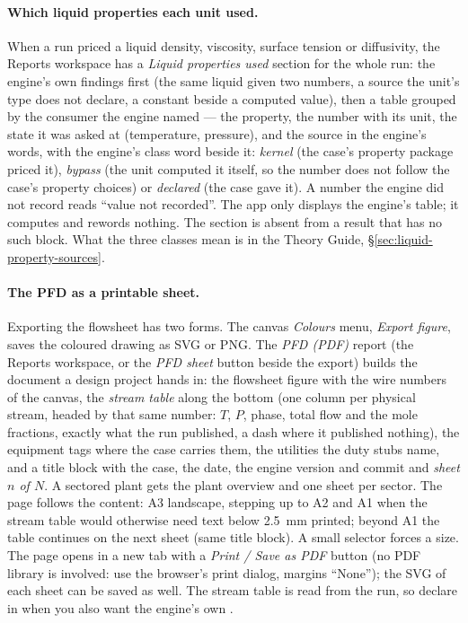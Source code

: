 \documentclass[11pt,a4paper]{article}
\begin{document}
\paragraph{Which liquid properties each unit used.}\label{sec:reports-liquid-properties}
When a run priced a liquid density, viscosity, surface tension or
diffusivity, the Reports workspace has a \emph{Liquid properties used}
section for the whole run: the engine's own findings first (the same liquid
given two numbers, a source the unit's type does not declare, a constant
beside a computed value), then a table grouped by the consumer the engine
named --- the property, the number with its unit, the state it was asked at
(temperature, pressure), and the source in the engine's words, with the
engine's class word beside it: \emph{kernel} (the case's property package
priced it), \emph{bypass} (the unit computed it itself, so the number does not
follow the case's property choices) or \emph{declared} (the case gave it).  A
number the engine did not record reads ``value not recorded''.  The app only
displays the engine's table; it computes and rewords nothing.  The section is
absent from a result that has no such block.  What the three classes mean is
in the Theory Guide, \S\ref{sec:liquid-property-sources}.

\paragraph{The PFD as a printable sheet.}\label{sec:pfd-sheet}
Exporting the flowsheet has two forms.  The canvas \emph{Colours} menu,
\emph{Export figure}, saves the coloured drawing as SVG or PNG.  The
\emph{PFD (PDF)} report (the Reports workspace, or the \emph{PFD sheet}
button beside the export) builds the document a design project hands in:
the flowsheet figure with the wire numbers of the canvas, the
\emph{stream table} along the bottom (one column per physical stream,
headed by that same number: $T$, $P$, phase, total flow and the mole
fractions, exactly what the run published, a dash where it published
nothing), the equipment tags where the case carries them, the utilities
the duty stubs name, and a title block with the case, the date, the engine
version and commit and \emph{sheet $n$ of $N$}.  A sectored plant gets the
plant overview and one sheet per sector.  The page follows the content: A3
landscape, stepping up to A2 and A1 when the stream table would otherwise
need text below 2.5~mm printed; beyond A1 the table continues on the next
sheet (same title block).  A small selector forces a size.  The page opens
in a new tab with a \emph{Print / Save as PDF} button (no PDF library is
involved: use the browser's print dialog, margins ``None''); the SVG of each
sheet can be saved as well.  The stream table is read from the run, so
declare  in  when you
also want the engine's own .
\end{document}
